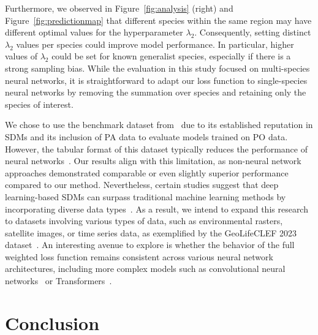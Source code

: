 \documentclass[3p,preprint,12pt]{elsarticle}
\begin{document}
Furthermore, we observed in Figure~\ref{fig:analysis} (right) and Figure~\ref{fig:predictionmap} that different species within the same region may have different optimal values for the hyperparameter $\lambda_2$. Consequently, setting distinct $\lambda_2$ values per species could improve model performance. In particular, higher values of $\lambda_2$ could be set for known generalist species, especially if there is a strong sampling bias. While the evaluation in this study focused on multi-species neural networks, it is straightforward to adapt our loss function to single-species neural networks by removing the summation over species and retaining only the species of interest. %

We chose to use the benchmark dataset from~\cite{elith2020presence} due to its established reputation in SDMs and its inclusion of PA data to evaluate models trained on PO data. However, the tabular format of this dataset typically reduces the performance of neural networks~\citep{borisov2022deep, grinsztajn2022tree}. Our results align with this limitation, as non-neural network approaches demonstrated comparable or even slightly superior performance compared to our method. Nevertheless, certain studies suggest that deep learning-based SDMs can surpass traditional machine learning methods by incorporating diverse data types~\citep{zhang2022novel, botella2023geolifeclef2023, teng2023satbird}. As a result, we intend to expand this research to datasets involving various types of data, such as environmental rasters, satellite images, or time series data, as exemplified by the GeoLifeCLEF 2023 dataset~\citep{botella2023geolifeclef2023}. An interesting avenue to explore is whether the behavior of the full weighted loss function remains consistent across various neural network architectures, including more complex models such as convolutional neural networks~\citep{krizhevsky2012imagenet} or Transformers~\citep{vaswani2017attention}.

\section{Conclusion}
\label{sec:conclusion}
\end{document}

